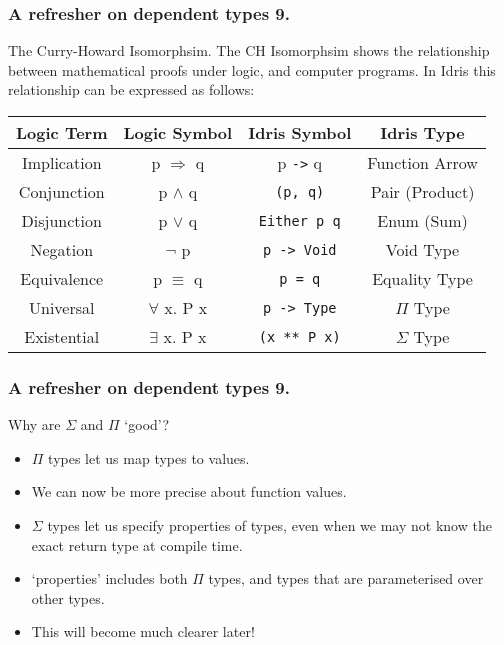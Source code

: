\documentclass{beamer}
\begin{document}
\begin{frame}[fragile]
  \frametitle{A refresher on dependent types 9.}
  \begin{block}{The Curry-Howard Isomorphsim.}
  The CH Isomorphsim shows the relationship between mathematical
    proofs under logic, and computer programs. In Idris this
    relationship can be expressed as follows:
  \begin{table}[h!]
    \begin{tabular}{c|c|c|c}
    \textbf{Logic Term} & \textbf{Logic Symbol} & \textbf{Idris Symbol}
      & \textbf{Idris Type} \\
    \hline
      Implication & p $\Rightarrow$ q & p \texttt{->} q
      & Function Arrow \\
      Conjunction & p $\land$ q & \texttt{(p, q)} 
      & Pair (Product) \\
      Disjunction & p $\lor$ q & \texttt{Either p q}
      & Enum (Sum)\\
      Negation & $\lnot$ p & \texttt{p -> Void} &
      Void Type \\
      Equivalence & p $\equiv$ q & \texttt{p = q}
      & Equality Type \\
      Universal & $\forall$ x. P x & 
      \texttt{p -> Type} & $\Pi$ Type \\
      Existential & $\exists$ x. P x
      & \texttt{(x ** P x)} & $\Sigma$ Type
    \end{tabular}
    
  \end{table}
  \end{block}
\end{frame}

\begin{frame}[fragile]
  \frametitle{A refresher on dependent types 9.}
  \begin{block}{Why are $\Sigma$ and $\Pi$ `good'?}
  \begin{itemize}
    \item $\Pi$ types let us map types to values.
    \item We can now be more precise about function values.
    \item $\Sigma$ types let us specify properties of types, even
      when we may not know the exact return type at compile time.
    \item `properties' includes both $\Pi$ types, and types that are
      parameterised over other types.
    \item This will become much clearer later!
  \end{itemize}
  \end{block}
\end{frame}
\end{document}
